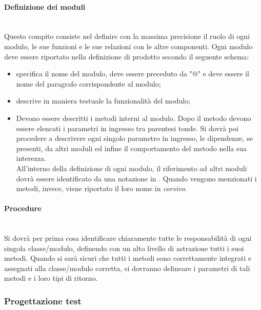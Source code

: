\paragraph{Definizione dei moduli} \hfill \\
\label{}
Questo compito consiste nel definire con la massima precisione il ruolo di ogni modulo, le sue funzioni e le sue relazioni con le altre componenti.
Ogni modulo deve essere riportato nella definizione di prodotto secondo il seguente schema:
\begin{itemize}
\item {}specifica il nome del modulo, deve essere preceduto da "@" e deve essere il nome del paragrafo corrispondente al modulo;
\item {}descrive in maniera testuale la funzionalità del modulo;
\item {} Devono essere descritti i metodi interni al modulo. Dopo il metodo devono essere elencati i parametri in ingresso tra parentesi tonde.
Si dovrà poi procedere a descrivere ogni singolo parametro in ingresso, le dipendenze, se presenti, da altri moduli ed infine il comportamento del metodo nella sua interezza.\\
All'interno della definizione di ogni modulo, il riferimento ad altri moduli dovrà essere identificato da una notazione in . Quando vengono menzionati i metodi, invece, viene riportato il loro nome in \textit{corsivo}.

\end{itemize}


\paragraph{Procedure} \hfill \\
Si dovrà per prima cosa identificare chiaramente tutte le responsabilità di ogni singola classe/modulo, definendo con un alto livello di astrazione tutti i suoi metodi.
Quando si sarà sicuri che tutti i metodi sono correttamente integrati e assegnati alla classe/modulo corretta, si dovranno delineare i parametri di tali metodi e i loro tipi di ritorno.

\subsubsection{Progettazione test}
\label{prog_test}
